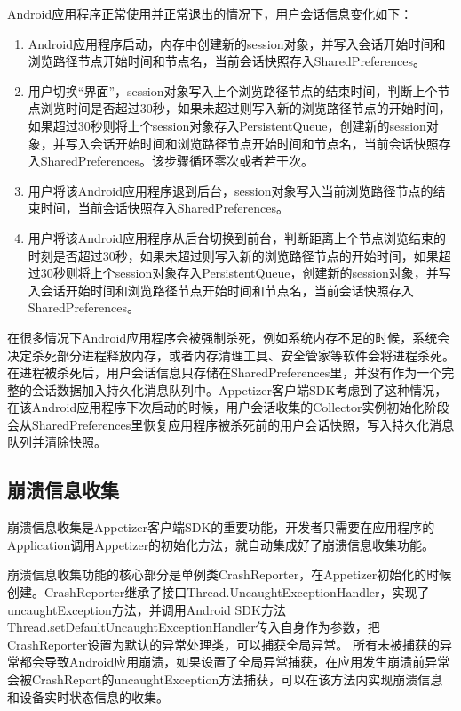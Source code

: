 Android应用程序正常使用并正常退出的情况下，用户会话信息变化如下：

\begin{enumerate}
	\item Android应用程序启动，内存中创建新的session对象，并写入会话开始时间和浏览路径节点开始时间和节点名，当前会话快照存入SharedPreferences。
	\item 用户切换“界面”，session对象写入上个浏览路径节点的结束时间，判断上个节点浏览时间是否超过30秒，如果未超过则写入新的浏览路径节点的开始时间，如果超过30秒则将上个session对象存入PersistentQueue，创建新的session对象，并写入会话开始时间和浏览路径节点开始时间和节点名，当前会话快照存入SharedPreferences。该步骤循环零次或者若干次。
	\item 用户将该Android应用程序退到后台，session对象写入当前浏览路径节点的结束时间，当前会话快照存入SharedPreferences。
	\item 用户将该Android应用程序从后台切换到前台，判断距离上个节点浏览结束的时刻是否超过30秒，如果未超过则写入新的浏览路径节点的开始时间，如果超过30秒则将上个session对象存入PersistentQueue，创建新的session对象，并写入会话开始时间和浏览路径节点开始时间和节点名，当前会话快照存入SharedPreferences。
\end{enumerate} 

在很多情况下Android应用程序会被强制杀死，例如系统内存不足的时候，系统会决定杀死部分进程释放内存，或者内存清理工具、安全管家等软件会将进程杀死。在进程被杀死后，用户会话信息只存储在SharedPreferences里，并没有作为一个完整的会话数据加入持久化消息队列中。Appetizer客户端SDK考虑到了这种情况，在该Android应用程序下次启动的时候，用户会话收集的Collector实例初始化阶段会从SharedPreferences里恢复应用程序被杀死前的用户会话快照，写入持久化消息队列并清除快照。

\subsection{崩溃信息收集}
\label{subsec:crashCollector}

崩溃信息收集是Appetizer客户端SDK的重要功能，开发者只需要在应用程序的Application调用Appetizer的初始化方法，就自动集成好了崩溃信息收集功能。


崩溃信息收集功能的核心部分是单例类CrashReporter，在Appetizer初始化的时候创建。CrashReporter继承了接口Thread.UncaughtExceptionHandler，实现了uncaughtException方法，并调用Android SDK方法Thread.setDefaultUncaughtExceptionHandler传入自身作为参数，把CrashReporter设置为默认的异常处理类，可以捕获全局异常。
所有未被捕获的异常都会导致Android应用崩溃，如果设置了全局异常捕获，在应用发生崩溃前异常会被CrashReport的uncaughtException方法捕获，可以在该方法内实现崩溃信息和设备实时状态信息的收集。

